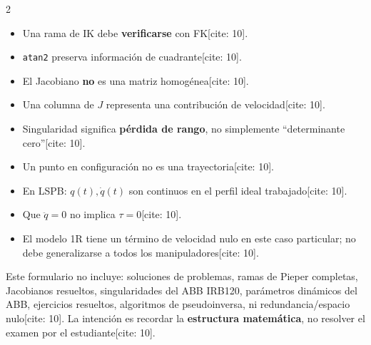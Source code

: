 \documentclass[10pt, a4paper]{article}
\begin{document}
\begin{multicols*}{2}
\begin{tcolorbox}[sectionbox, title=7. Recordatorios de Interpretación{[cite: 10]}]
\begin{itemize}
    \item Una rama de IK debe \textbf{verificarse} con FK[cite: 10].
    \item \texttt{atan2} preserva información de cuadrante[cite: 10].
    \item El Jacobiano \textbf{no} es una matriz homogénea[cite: 10].
    \item Una columna de $J$ representa una contribución de velocidad[cite: 10].
    \item Singularidad significa \textbf{pérdida de rango}, no simplemente “determinante cero”[cite: 10].
    \item Un punto en configuración no es una trayectoria[cite: 10].
    \item En LSPB: $q(t), \dot{q}(t)$ son continuos en el perfil ideal trabajado[cite: 10].
    \item Que $\ddot{q}=0$ no implica $\tau=0$[cite: 10].
    \item El modelo 1R tiene un término de velocidad nulo en este caso particular; no debe generalizarse a todos los manipuladores[cite: 10].
\end{itemize}
\end{tcolorbox}

\begin{tcolorbox}[colback=white, colframe=black, title=\textbf{9. Lo que este formulario NO contiene}]
Este formulario no incluye: soluciones de problemas, ramas de Pieper completas, Jacobianos resueltos, singularidades del ABB IRB120, parámetros dinámicos del ABB, ejercicios resueltos, algoritmos de pseudoinversa, ni redundancia/espacio nulo[cite: 10]. La intención es recordar la \textbf{estructura matemática}, no resolver el examen por el estudiante[cite: 10].
\end{tcolorbox}

\end{multicols*}
\end{document}
